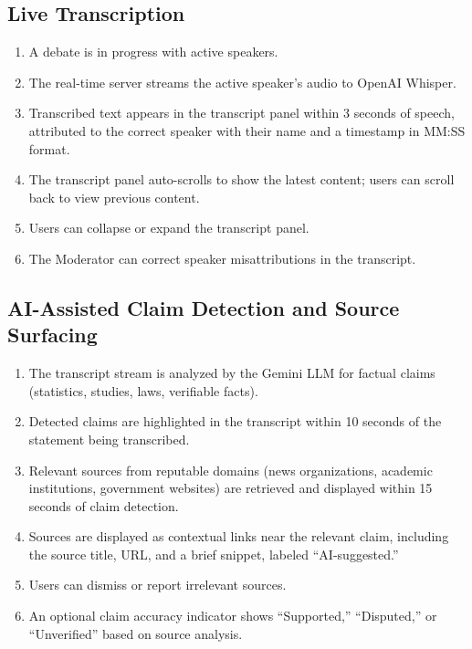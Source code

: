 \documentclass[12pt]{article}
\begin{document}
\subsection{Live Transcription}

\begin{enumerate}
    \item A debate is in progress with active speakers.
    \item The real-time server streams the active speaker's audio to OpenAI Whisper.
    \item Transcribed text appears in the transcript panel within 3 seconds of speech, attributed to the correct speaker with their name and a timestamp in MM:SS format.
    \item The transcript panel auto-scrolls to show the latest content; users can scroll back to view previous content.
    \item Users can collapse or expand the transcript panel.
    \item The Moderator can correct speaker misattributions in the transcript.
\end{enumerate}

\subsection{AI-Assisted Claim Detection and Source Surfacing}

\begin{enumerate}
    \item The transcript stream is analyzed by the Gemini LLM for factual claims (statistics, studies, laws, verifiable facts).
    \item Detected claims are highlighted in the transcript within 10 seconds of the statement being transcribed.
    \item Relevant sources from reputable domains (news organizations, academic institutions, government websites) are retrieved and displayed within 15 seconds of claim detection.
    \item Sources are displayed as contextual links near the relevant claim, including the source title, URL, and a brief snippet, labeled ``AI-suggested.''
    \item Users can dismiss or report irrelevant sources.
    \item An optional claim accuracy indicator shows ``Supported,'' ``Disputed,'' or ``Unverified'' based on source analysis.
\end{enumerate}
\end{document}
